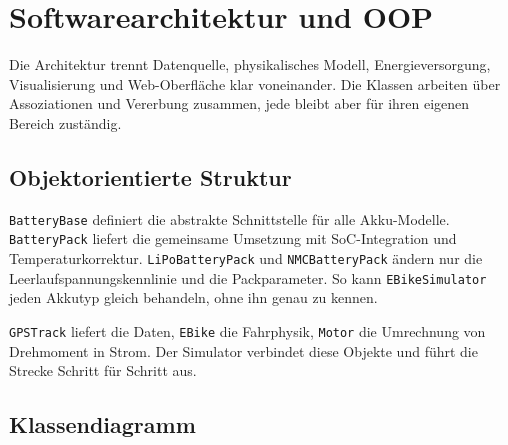 \chapter{Softwarearchitektur und OOP}
\label{ch:softwarearchitektur}

Die Architektur trennt Datenquelle, physikalisches Modell, Energieversorgung, Visualisierung und Web-Oberfläche klar voneinander. Die Klassen arbeiten über Assoziationen und Vererbung zusammen, jede bleibt aber für ihren eigenen Bereich zuständig.

\section{Objektorientierte Struktur}

\texttt{BatteryBase} definiert die abstrakte Schnittstelle für alle Akku-Modelle. \texttt{BatteryPack} liefert die gemeinsame Umsetzung mit SoC-Integration und Temperaturkorrektur. \texttt{LiPoBatteryPack} und \texttt{NMCBatteryPack} ändern nur die Leerlaufspannungskennlinie und die Packparameter. So kann \texttt{EBikeSimulator} jeden Akkutyp gleich behandeln, ohne ihn genau zu kennen.

\texttt{GPSTrack} liefert die Daten, \texttt{EBike} die Fahrphysik, \texttt{Motor} die Umrechnung von Drehmoment in Strom. Der Simulator verbindet diese Objekte und führt die Strecke Schritt für Schritt aus.

\section{Klassendiagramm}

